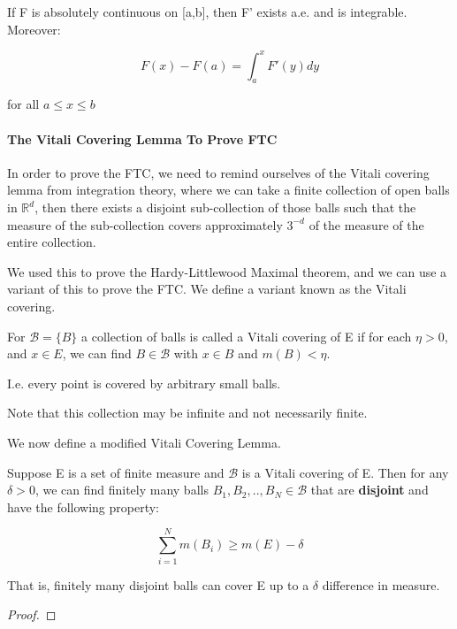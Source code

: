 \documentclass[class=article, crop=false]{standalone}
\begin{document}
			\begin{theorem} 
			\label{thm:second_ftc}
				If F is absolutely continuous on [a,b], then F' exists a.e. and is integrable. Moreover:

				$$F(x) - F(a) = \int_a^x F'(y) dy$$

				for all $a \le x \le b$

			\end{theorem}

			\paragraph{The Vitali Covering Lemma To Prove FTC}
			In order to prove the FTC, we need to remind ourselves of the Vitali covering lemma from integration theory, where we can take a finite collection of open balls in $\mathbb{R}^d$, then there exists a disjoint sub-collection of those balls such that the measure of the sub-collection covers approximately $3^{-d}$ of the measure of the entire collection. 

			We used this to prove the Hardy-Littlewood Maximal theorem, and we can use a variant of this to prove the FTC. We define a variant known as the Vitali covering.

			\begin{definition} 
				For $\mathcal{B} = \{B\}$ a collection of balls is called a Vitali covering of E if for each $\eta > 0$, and $x \in E$, we can find $B \in \mathcal{B}$ with $x \in B$ and $m(B) < \eta$. 

				I.e. every point is covered by arbitrary small balls.

				Note that this collection may be infinite and not necessarily finite.
			\end{definition}

			We now define a modified Vitali Covering Lemma.

			\begin{lemma}
				Suppose E is a set of finite measure and $\mathcal{B}$ is a Vitali covering of E. Then for any $\delta > 0$, we can find finitely many balls $B_1, B_2, .., B_N \in \mathcal{B}$ that are \textbf{disjoint} and have the following property:

					$$\sum_{i=1}^N m(B_i) \ge m(E) - \delta$$

				That is, finitely many disjoint balls can cover E up to a $\delta$ difference in measure.
			\end{lemma}
			\begin{proof}

			\end{proof} 
\end{document}
